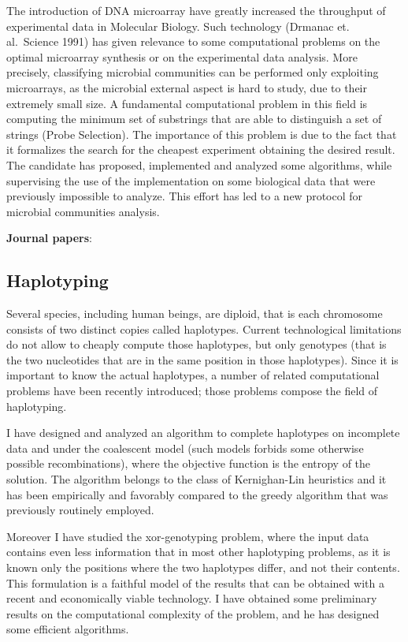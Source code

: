 \documentclass[11pt,a4paper,roman]{moderncv}
\begin{document}
The introduction of DNA microarray have greatly increased the throughput
of experimental data in Molecular Biology. Such technology (Drmanac et.
al.~Science 1991) has given relevance to some computational problems on
the optimal microarray synthesis or on the experimental data analysis.
More precisely, classifying microbial communities can be performed only
exploiting microarrays, as the microbial external aspect is hard to
study, due to their extremely small size. A fundamental computational
problem in this field is computing the minimum set of substrings that
are able to distinguish a set of strings (Probe Selection). The
importance of this problem is due to the fact that it formalizes the
search for the cheapest experiment obtaining the desired result. The
candidate has proposed, implemented and analyzed some algorithms, while
supervising the use of the implementation on some biological data that
were previously impossible to analyze. This effort has led to a new
protocol for microbial communities analysis.

\textbf{Journal
papers}:~\cite{DBLP:journals/bmcbi/RueggerVJB11,  valinskyAnalysisBacterialCommunity2002,valinskyOligonucleotideFingerprintingRRNA2002,bornemanProbeSelectionAlgorithms2001}

\subsection{Haplotyping}\label{haplotyping}

Several species, including human beings, are diploid, that is each
chromosome consists of two distinct copies called haplotypes. Current
technological limitations do not allow to cheaply compute those
haplotypes, but only genotypes (that is the two nucleotides that are in
the same position in those haplotypes). Since it is important to know
the actual haplotypes, a number of related computational problems have
been recently introduced; those problems compose the field of
haplotyping.

I have designed and analyzed an algorithm to complete haplotypes on
incomplete data and under the coalescent model (such models forbids some
otherwise possible recombinations), where the objective function is the
entropy of the solution. The algorithm belongs to the class of
Kernighan-Lin heuristics and it has been empirically and favorably
compared to the greedy algorithm that was previously routinely employed.

Moreover I have studied the xor-genotyping problem, where the input data
contains even less information that in most other haplotyping problems,
as it is known only the positions where the two haplotypes differ, and
not their contents. This formulation is a faithful model of the results
that can be obtained with a recent and economically viable technology.
I have obtained some preliminary results on the computational complexity
of the problem, and he has designed some efficient algorithms.
\end{document}
